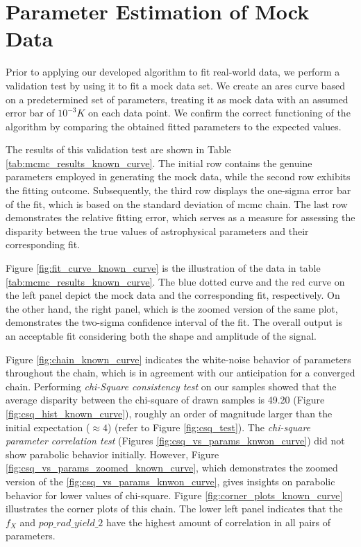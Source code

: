 \documentclass[12pt, TexShade, letterpaper]{report}
\begin{document}
\section{Parameter Estimation of Mock Data}
\label{chap:results,sub:known_curve}
Prior to applying our developed algorithm to fit real-world data, we perform a validation test by using it to fit a mock data set. We create an \gls{ares} curve based on a predetermined set of parameters, treating it as mock data with an assumed error bar of $10^{-3}K$ on each data point. We confirm the correct functioning of the algorithm by comparing the obtained fitted parameters to the expected values.\par
The results of this validation test are shown in Table \ref{tab:mcmc_results_known_curve}. The initial row contains the genuine parameters employed in generating the mock data, while the second row exhibits the fitting outcome. Subsequently, the third row displays the one-sigma error bar of the fit, which is based on the standard deviation of \gls{mcmc} chain. The last row demonstrates the relative fitting error, which serves as a measure for assessing the disparity between the true values of astrophysical parameters and their corresponding fit.\par 
Figure \ref{fig:fit_curve_known_curve} is the illustration of the data in table \ref{tab:mcmc_results_known_curve}. 
The blue dotted curve and the red curve on the left panel depict the mock data and the corresponding fit, respectively.
On the other hand, the right panel, which is the zoomed version of the same plot, demonstrates the two-sigma confidence interval of the fit. The overall output is an acceptable fit considering both the shape and amplitude of the signal.\par
Figure \ref{fig:chain_known_curve} indicates the white-noise behavior of parameters throughout the chain, which is in agreement with our anticipation for a converged chain. Performing \emph{chi-Square consistency test} on our samples showed that the average disparity between the chi-square of drawn samples is 49.20 (Figure \ref{fig:csq_hist_known_curve}), roughly an order of magnitude larger than the initial expectation ($\approx4$) (refer to Figure \ref{fig:csq_test}). The \emph{chi-square parameter correlation test} (Figures \ref{fig:csq_vs_params_knwon_curve}) did not show parabolic behavior initially. However, Figure \ref{fig:csq_vs_params_zoomed_known_curve}, which demonstrates the zoomed version of the \ref{fig:csq_vs_params_knwon_curve}, gives insights on parabolic behavior for lower values of chi-square. Figure \ref{fig:corner_plots_known_curve} illustrates the corner plots of this chain. The lower left panel indicates that the $f_X$ and $pop\_rad\_ yield\_2$ have the highest amount of correlation in all pairs of parameters.\par
\end{document}
